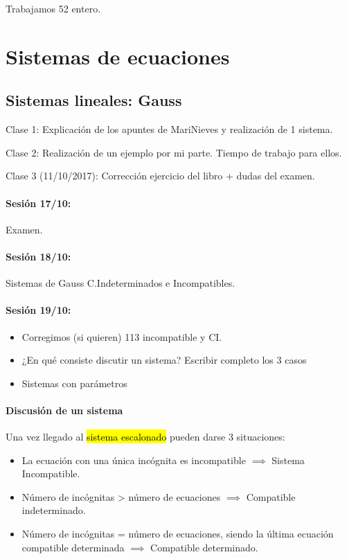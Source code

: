 Trabajamos 52 entero.

\section{Sistemas de ecuaciones}

\subsection{Sistemas lineales: Gauss}


Clase 1: Explicación de los apuntes de MariNieves y realización de 1 sistema.

Clase 2: Realización de un ejemplo por mi parte. Tiempo de trabajo para ellos.

Clase 3 (11/10/2017): Corrección ejercicio del libro + dudas del examen. 

\paragraph{Sesión 17/10:} Examen.

\paragraph{Sesión 18/10:} Sistemas de Gauss C.Indeterminados e Incompatibles.

\paragraph{Sesión 19/10:} 
\begin{itemize}
	\item Corregimos (si quieren) 113 incompatible y CI.
	\item ¿En qué consiste discutir un sistema? Escribir completo los 3 casos
	\item Sistemas con parámetros
\end{itemize}

\paragraph{Discusión de un sistema}

Una vez llegado al \hl{sistema escalonado} pueden darse 3 situaciones:

\begin{itemize}
	\item La ecuación con una única incógnita es incompatible $\implies$ Sistema Incompatible.
	\item Número de incógnitas > número de ecuaciones $\implies$ Compatible indeterminado.
	\item Número de incógnitas = número de ecuaciones, siendo la última ecuación compatible determinada $\implies$ Compatible determinado.
\end{itemize}

